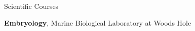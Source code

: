 \begin{rubric}{Scientific Courses}

\entry*[2015]%
	\textbf{Embryology}, Marine Biological Laboratory at Woods Hole

\end{rubric}
